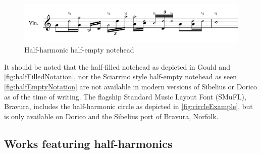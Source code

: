 \begin{figure}
  \includegraphics[page=2,width=\textwidth]{resources/halfharmonicsExampleNotation.pdf}
  \caption{Half-harmonic half-empty notehead} \label{fig:halfEmptyNotation}
\end{figure}








It should be noted that the half-filled notehead as depicted in Gould and \autoref{fig:halfFilledNotation}, nor the Sciarrino style half-empty notehead as seen \autoref{fig:halfEmptyNotation} are not available in modern versions of Sibelius or Dorico as of the time of writing.\autocite[424]{gouldBars2011}
The flagship Standard Music Layout Font (SMuFL), Bravura, includes the half-harmonic circle as depicted in \autoref{fig:circleExample}, but is only available on Dorico and the Sibelius port of Bravura, Norfolk.\autocite[]{w3ccommitteeStandardMusicFont2019}

\subsection{Works featuring half-harmonics} \label{sec:half-harmonicsLiterature}

